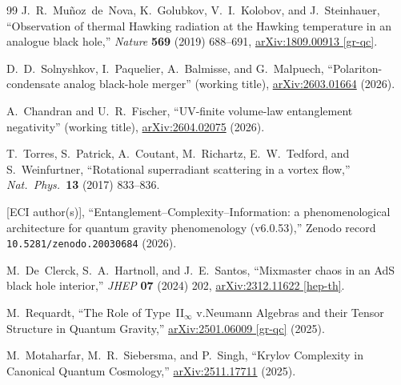 \documentclass[12pt,a4paper]{article}
\begin{document}
\begin{thebibliography}{99}
J.~R.~Mu\~{n}oz~de~Nova, K.~Golubkov, V.~I.~Kolobov, and J.~Steinhauer,
``Observation of thermal Hawking radiation at the Hawking temperature in
an analogue black hole,''
\textit{Nature} \textbf{569} (2019) 688--691,
\href{https://arxiv.org/abs/1809.00913}{arXiv:1809.00913 [gr-qc]}.

D.~D.~Solnyshkov, I.~Paquelier, A.~Balmisse, and G.~Malpuech,
``Polariton-condensate analog black-hole merger'' (working title),
\href{https://arxiv.org/abs/2603.01664}{arXiv:2603.01664}
(2026).

A.~Chandran and U.~R.~Fischer,
``UV-finite volume-law entanglement negativity'' (working title),
\href{https://arxiv.org/abs/2604.02075}{arXiv:2604.02075}
(2026).

T.~Torres, S.~Patrick, A.~Coutant, M.~Richartz, E.~W.~Tedford, and S.~Weinfurtner,
``Rotational superradiant scattering in a vortex flow,''
\textit{Nat.\ Phys.}\ \textbf{13} (2017) 833--836.

[ECI author(s)],
``Entanglement--Complexity--Information: a phenomenological architecture
for quantum gravity phenomenology (v6.0.53),''
Zenodo record \texttt{10.5281/zenodo.20030684} (2026).

M.~De~Clerck, S.~A.~Hartnoll, and J.~E.~Santos,
``Mixmaster chaos in an AdS black hole interior,''
\textit{JHEP} \textbf{07} (2024) 202,
\href{https://arxiv.org/abs/2312.11622}{arXiv:2312.11622 [hep-th]}.

M.~Requardt,
``The Role of Type~II$_\infty$ v.Neumann Algebras and their Tensor Structure
  in Quantum Gravity,''
\href{https://arxiv.org/abs/2501.06009}{arXiv:2501.06009 [gr-qc]} (2025).

M.~Motaharfar, M.~R.~Siebersma, and P.~Singh,
``Krylov Complexity in Canonical Quantum Cosmology,''
\href{https://arxiv.org/abs/2511.17711}{arXiv:2511.17711} (2025).

\end{thebibliography}
\end{document}
